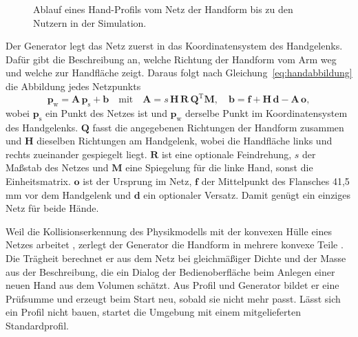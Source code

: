 \begin{figure}[htbp]
  \centering
  
  \caption[Ablauf eines Hand-Profils]{Ablauf eines Hand-Profils vom Netz der Handform bis zu den Nutzern in der Simulation.}
  \label{fig:handprofil}
\end{figure}

Der Generator legt das Netz zuerst in das Koordinatensystem des Handgelenks.
Dafür gibt die Beschreibung an, welche Richtung der Handform vom Arm weg und welche zur Handfläche zeigt.
Daraus folgt nach Gleichung~\ref{eq:handabbildung} die Abbildung jedes Netzpunkts
\begin{equation}
  \mathbf{p}_\mathrm{w} = \mathbf{A}\,\mathbf{p}_\mathrm{s} + \mathbf{b}
  \quad\mathrm{mit}\quad
  \mathbf{A} = s\,\mathbf{H}\,\mathbf{R}\,\mathbf{Q}^\mathrm{T}\mathbf{M} ,
  \quad
  \mathbf{b} = \mathbf{f} + \mathbf{H}\,\mathbf{d} - \mathbf{A}\,\mathbf{o} ,
  \label{eq:handabbildung}
\end{equation}
%
wobei $\mathbf{p}_\mathrm{s}$ ein Punkt des Netzes ist und $\mathbf{p}_\mathrm{w}$ derselbe Punkt im Koordinatensystem des Handgelenks.
$\mathbf{Q}$ fasst die angegebenen Richtungen der Handform zusammen und $\mathbf{H}$ dieselben Richtungen am Handgelenk, wobei die Handfläche links und rechts zueinander gespiegelt liegt.
$\mathbf{R}$ ist eine optionale Feindrehung, $s$ der Maßstab des Netzes und $\mathbf{M}$ eine Spiegelung für die linke Hand, sonst die Einheitsmatrix.
$\mathbf{o}$ ist der Ursprung im Netz, $\mathbf{f}$ der Mittelpunkt des Flansches 41,5\,mm vor dem Handgelenk und $\mathbf{d}$ ein optionaler Versatz.
Damit genügt ein einziges Netz für beide Hände.

Weil die Kollisionserkennung des Physikmodells mit der konvexen Hülle eines Netzes arbeitet \cite{MujocoDoku2026a}, zerlegt der Generator die Handform in mehrere konvexe Teile .
Die Trägheit berechnet er aus dem Netz bei gleichmäßiger Dichte und der Masse aus der Beschreibung, die ein Dialog der Bedienoberfläche beim Anlegen einer neuen Hand aus dem Volumen schätzt.
Aus Profil und Generator bildet er eine Prüfsumme und erzeugt beim Start neu, sobald sie nicht mehr passt. Lässt sich ein Profil nicht bauen, startet die Umgebung mit einem mitgelieferten Standardprofil.

